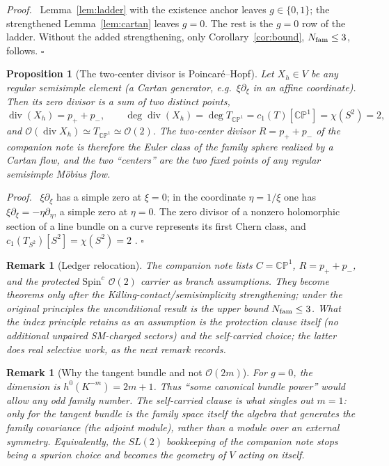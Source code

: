 \documentclass[
  aps,
  prd,
  preprint,
  nofootinbib,
  superscriptaddress,
  longbibliography
]{revtex4-2}
\newcommand{\Spin}{\mathrm{Spin}}
\newcommand{\CP}{\mathbb{CP}}
\newcommand{\cO}{\mathcal{O}}
\DeclareMathOperator{\divisor}{div}
\newtheorem{proposition}[theorem]{Proposition}
\newtheorem{remark}[theorem]{Remark}
\newenvironment{proof}{\par\noindent\textit{Proof.}\ }{\hfill\(\square\)\par}
\begin{document}
\begin{proof}
Lemma~\ref{lem:ladder} with the existence anchor leaves \(g\in\{0,1\}\);
the strengthened Lemma~\ref{lem:cartan} leaves \(g=0\).  The rest is the
\(g=0\) row of the ladder.  Without the added strengthening, only
Corollary~\ref{cor:bound}, \(N_{\rm fam}\le3\), follows.
\end{proof}

\begin{proposition}[The two-center divisor is Poincar\'e--Hopf]
\label{prop:ph}
Let \(X_h\in V\) be any regular semisimple element (a Cartan generator,
e.g.\ \(\xi\partial_\xi\) in an affine coordinate).  Then its zero divisor
is a sum of two distinct points,
\[
  \divisor(X_h)=p_++p_-,\qquad
  \deg\divisor(X_h)=\deg T_{\CP^1}=c_1(T)[\CP^1]=\chi(S^2)=2,
\]
and \(\cO(\divisor X_h)\simeq T_{\CP^1}\simeq\cO(2)\).  The two-center
divisor \(R=p_++p_-\) of the companion note is therefore the Euler class of
the family sphere realized by a Cartan flow, and the two ``centers'' are
the two fixed points of any regular semisimple M\"obius flow.
\end{proposition}

\begin{proof}
\(\xi\partial_\xi\) has a simple zero at \(\xi=0\); in the coordinate
\(\eta=1/\xi\) one has \(\xi\partial_\xi=-\eta\partial_\eta\), a simple
zero at \(\eta=0\).  The zero divisor of a nonzero holomorphic section of a
line bundle on a curve represents its first Chern class, and
\(c_1(T_{S^2})[S^2]=\chi(S^2)=2\) \cite{GriffithsHarris1978}.
\end{proof}

\begin{remark}[Ledger relocation]
\label{rem:relocation2}
The companion note lists \(C=\CP^1\), \(R=p_++p_-\), and the protected
\(\Spin^c\) \(\cO(2)\) carrier as branch assumptions.  They become theorems
only after the Killing-contact/semisimplicity strengthening; under the original
principles the unconditional result is the upper bound \(N_{\rm fam}\le3\).
What the index principle retains as an assumption is the protection clause
itself (no additional unpaired SM-charged sectors) and the self-carried
choice; the latter does real selective work, as the next remark records.
\end{remark}

\begin{remark}[Why the tangent bundle and not \(\cO(2m)\)]
For \(g=0\), the dimension is \(h^0(K^{-m})=2m+1\).  Thus ``some
canonical bundle power'' would allow any odd family number.  The
self-carried clause is what
singles out \(m=1\): only for the tangent bundle is the family space itself
the algebra that generates the family covariance (the adjoint module),
rather than a module over an external symmetry.  Equivalently, the
\(SL(2)\) bookkeeping of the companion note stops being a spurion choice
and becomes the geometry of \(V\) acting on itself.
\end{remark}
\end{document}
